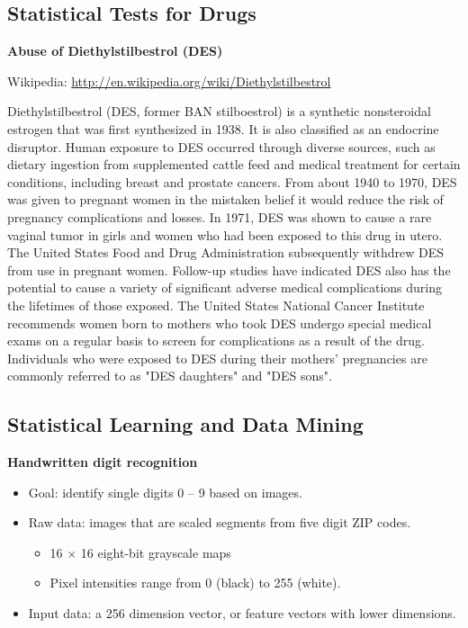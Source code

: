 \documentclass[12pt]{article}
\begin{document}
\subsection{Statistical Tests for Drugs}

\textbf{Abuse of Diethylstilbestrol (DES)}

Wikipedia: \url{http://en.wikipedia.org/wiki/Diethylstilbestrol}

Diethylstilbestrol (DES, former BAN stilboestrol) is a synthetic
nonsteroidal estrogen that was first synthesized in 1938. It is also
classified as an endocrine disruptor. Human exposure to DES occurred
through diverse sources, such as dietary ingestion from supplemented
cattle feed and medical treatment for certain conditions, including
breast and prostate cancers. From about 1940 to 1970, DES was given to
pregnant women in the mistaken belief it would reduce the risk of
pregnancy complications and losses. In 1971, DES was shown to cause a
rare vaginal tumor in girls and women who had been exposed to this
drug in utero. The United States Food and Drug Administration
subsequently withdrew DES from use in pregnant women. Follow-up
studies have indicated DES also has the potential to cause a variety
of significant adverse medical complications during the lifetimes of
those exposed. The United States National Cancer Institute
recommends women born to mothers who took DES undergo special
medical exams on a regular basis to screen for complications as a
result of the drug. Individuals who were exposed to DES during their
mothers' pregnancies are commonly referred to as "DES daughters" and
"DES sons".


\subsection{Statistical Learning and Data Mining}

\textbf{Handwritten digit recognition}

 \begin{itemize}
  \item Goal: identify single digits 0 -- 9 based on images.
  \item Raw data: images that are scaled segments from five digit ZIP codes.
\begin{itemize}
\item 16 $\times$ 16 eight-bit grayscale maps 
\item Pixel intensities range from 0
  (black) to 255 (white).
\end{itemize}
\item Input data: a 256 dimension vector, or feature vectors with lower dimensions.
  \end{itemize}
\end{document}
